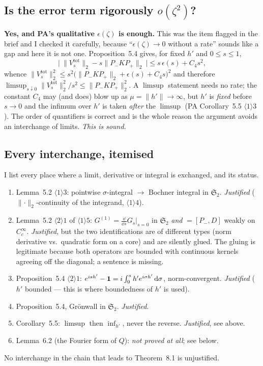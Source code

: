 \documentclass[11pt]{article}
\newcommand{\Pp}{P_+}\newcommand{\Pm}{P_-}
\providecommand{\Stwo}{\mathfrak S_2}\providecommand{\Sone}{\mathfrak S_1}
\providecommand{\norm}[1]{\lVert #1\rVert}\providecommand{\abs}[1]{\lvert #1\rvert}
\begin{document}
\subsection{Is the error term rigorously $o(\zeta^2)$?}
\textbf{Yes, and PA's qualitative $\epsilon(\zeta)$ is enough.}  This was the item flagged in the
brief and I checked it carefully, because ``$\epsilon(\zeta)\to0$ without a rate'' sounds like a gap
and here it is not one.  Proposition~5.4 gives, for fixed $h'$ and $0\le s\le1$,
\[
 \bigl|\ \norm{V^{\mathrm{tot}}_s}_2-s\norm{\Pm K\Pp}_2\ \bigr|\le s\,\epsilon(s)+C_4s^2 ,
\]
whence $\norm{V^{\mathrm{tot}}_s}_2^2\le s^2\bigl(\norm{\Pm K\Pp}_2+\epsilon(s)+C_4s\bigr)^2$ and
therefore $\limsup_{s\downarrow0}\norm{V^{\mathrm{tot}}_s}_2^2/s^2\le\norm{\Pm K\Pp}_2^2$.  A
$\limsup$ statement needs no rate; the constant $C_4$ may (and does) blow up as
$\mu=\norm{h'}\to\infty$, but $h'$ is \emph{fixed} before $s\to0$ and the infimum over $h'$ is taken
\emph{after} the $\limsup$ (PA Corollary~5.5 $\langle1\rangle3$).  The order of quantifiers is
correct and is the whole reason the argument avoids an interchange of limits.  \emph{This is
sound.}

\subsection{Every interchange, itemised}
I list every place where a limit, derivative or integral is exchanged, and its status.
\begin{enumerate}[label=(X\arabic*),leftmargin=3em]
\item Lemma~5.2 $\langle1\rangle3$: pointwise $\sigma$-integral $\to$ Bochner integral in $\Stwo$.
 \emph{Justified} ($\norm\cdot_2$-continuity of the integrand, $\langle1\rangle4$).
\item Lemma~5.2 $\langle2\rangle1$ of $\langle1\rangle5$: $G^{(1)}=\frac{\dd}{\dd s}G_s|_{s=0}$ in
 $\Stwo$ \emph{and} $=[\Pm,D]$ weakly on $C_c^\infty$.  \emph{Justified}, but the two identifications
 are of different types (norm derivative vs.\ quadratic form on a core) and are silently glued.  The
 gluing is legitimate because both operators are bounded with continuous kernels agreeing off the
 diagonal; a sentence is missing.
\item Proposition~5.4 $\langle2\rangle1$: $e^{ish'}-\mathbf 1=i\int_0^sh'e^{i\sigma h'}\,\mathrm d\sigma$,
 norm-convergent.  \emph{Justified} ($h'$ bounded --- this is where boundedness of $h'$ is used).
\item Proposition~5.4, Gr\"onwall in $\Stwo$.  \emph{Justified}.
\item Corollary~5.5: $\limsup$ then $\inf_{h'}$, never the reverse.  \emph{Justified}, see above.
\item Lemma~6.2 (the Fourier form of $Q$): \emph{not proved at all}; see below.
\end{enumerate}
No interchange in the chain that leads to Theorem~8.1 is unjustified.
\end{document}
